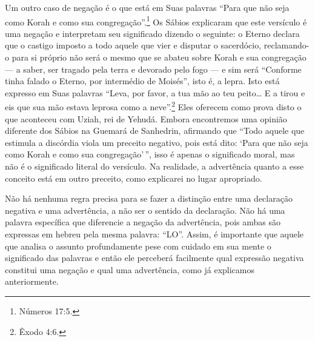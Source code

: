Um outro caso de negação é o que está em Suas palavras ``Para que não
seja como Korah e como sua congregação''.\footnote{Números 17:5.} Os Sábios
explicaram que este versículo é uma negação e interpretam seu
significado dizendo o seguinte: o Eterno declara que o castigo imposto
a todo aquele que vier e disputar o sacerdócio, reclamando-o para si
próprio não será o mesmo que se abateu sobre Korah e sua congregação ---
a saber, ser tragado pela terra e devorado pelo fogo --- e sim será
``Conforme tinha falado o Eterno, por intermédio de Moisés'', isto é, a
lepra. Isto está expresso em Suas palavras ``Leva, por favor, a tua mão
ao teu peito\ldots{} E a tirou e eis que sua mão estava leprosa como a neve''.\footnote{Êxodo 4:6.} Eles oferecem como prova disto o que aconteceu com Uziah,
rei de Yehudá. Embora encontremos uma opinião diferente dos Sábios na
Guemará de Sanhedrin, afirmando que ``Todo aquele que estimula a
discórdia viola um preceito negativo, pois está dito: `Para que não seja
como Korah e como sua congregação'\,'', isso é apenas o significado moral,
mas não é o significado literal do versículo. Na realidade, a
advertência quanto a esse conceito está em outro preceito, como
explicarei no lugar apropriado.

Não há nenhuma regra precisa para se fazer a distinção entre uma
declaração negativa e uma advertência, a não ser o sentido da
declaração. Não há uma palavra específica que diferencie a negação da
advertência, pois ambas são expressas em hebreu pela mesma palavra:
``LO''. Assim, é importante que aquele que analisa o assunto
profundamente pese com cuidado em sua mente o significado das palavras e
então ele perceberá facilmente qual expressão negativa constitui uma
negação e qual uma advertência, como já explicamos anteriormente.

